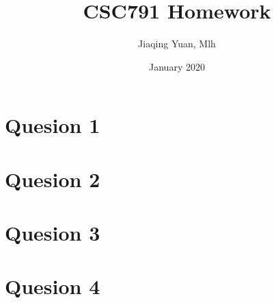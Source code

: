 \documentclass{article}
\title{CSC791 Homework}
\author{Jiaqing Yuan, Mlh}
\date{January 2020}
\begin{document}
\maketitle

\section{Quesion 1}
\section{Quesion 2}
\section{Quesion 3}
\section{Quesion 4}




\end{document}
